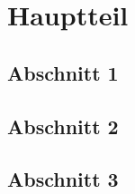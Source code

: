 \chapter{Hauptteil}\label{chapter: Hauptteil}

	\section{Abschnitt 1}
	
	\section{Abschnitt 2}
	
	\section{Abschnitt 3}